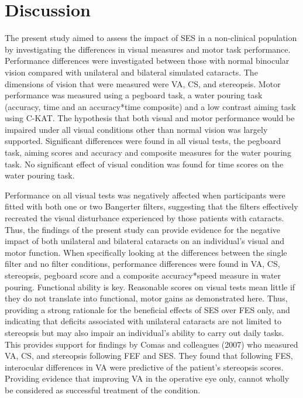 \documentclass[
  english,
  man,floatsintext]{apa6}
\begin{document}
\hypertarget{discussion-1}{%
\section{Discussion}\label{discussion-1}}

The present study aimed to assess the impact of SES in a non-clinical population by investigating the differences in visual measures and motor task performance.
Performance differences were investigated between those with normal binocular vision compared with unilateral and bilateral simulated cataracts.
The dimensions of vision that were measured were VA, CS, and stereopsis. Motor performance was measured using a pegboard task, a water pouring task (accuracy, time and an accuracy*time composite) and a low contrast aiming task using C-KAT.
The hypothesis that both visual and motor performance would be impaired under all visual conditions other than normal vision was largely supported.
Significant differences were found in all visual tests, the pegboard task, aiming scores and accuracy and composite measures for the water pouring task.
No significant effect of visual condition was found for time scores on the water pouring task.

Performance on all visual tests was negatively affected when participants were fitted with both one or two Bangerter filters, suggesting that the filters effectively recreated the visual disturbance experienced by those patients with cataracts.
Thus, the findings of the present study can provide evidence for the negative impact of both unilateral and bilateral cataracts on an individual's visual and motor function.
When specifically looking at the differences between the single filter and no filter conditions, performance differences were found in VA, CS, stereopsis, pegboard score and a composite accuracy*speed measure in water pouring.
Functional ability is key. Reasonable scores on visual tests mean little if they do not translate into functional, motor gains as demonstrated here.
Thus, providing a strong rationale for the beneficial effects of SES over FES only, and indicating that deficits associated with unilateral cataracts are not limited to stereopsis but may also impair an individual's ability to carry out daily tasks.
This provides support for findings by Comas and colleagues (2007) who measured VA, CS, and stereopsis following FEF and SES.
They found that following FES, interocular differences in VA were predictive of the patient's stereopsis scores.
Providing evidence that improving VA in the operative eye only, cannot wholly be considered as successful treatment of the condition.
\end{document}
